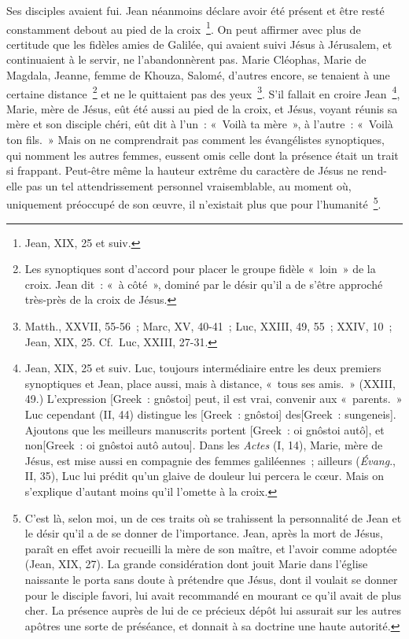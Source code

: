 \documentclass[french,twoside]{book} %
\begin{document}
Ses disciples avaient fui. Jean néanmoins déclare avoir été présent et être resté constamment debout au pied de la croix \footnote{Jean, XIX, 25 et suiv.}. On peut affirmer avec plus de certitude que les fidèles amies de Galilée, qui avaient suivi Jésus à Jérusalem, et continuaient à le servir, ne l’abandonnèrent pas. Marie Cléophas, Marie de Magdala, Jeanne, femme de Khouza, Salomé, d’autres encore, se tenaient à une certaine distance \footnote{Les synoptiques sont d’accord pour placer le groupe fidèle « loin » de la croix. Jean dit : « à côté », dominé par le désir qu’il a de s’être approché très-près de la croix de Jésus.} et ne le quittaient pas des yeux \footnote{Matth., XXVII, 55-56 ; Marc, XV, 40-41 ; Luc, XXIII, 49, 55 ; XXIV, 10 ; Jean, XIX, 25. Cf. Luc, XXIII, 27-31.}. S’il fallait en croire Jean \footnote{ Jean, XIX, 25 et suiv. Luc, toujours intermédiaire entre les deux premiers synoptiques et Jean, place aussi, mais à distance, « tous ses amis. » (XXIII, 49.) L’expression [Greek : gnôstoi] peut, il est vrai, convenir aux « parents. » Luc cependant (II, 44) distingue les [Greek : gnôstoi] des[Greek : sungeneis]. Ajoutons que les meilleurs manuscrits portent [Greek : oi gnôstoi autô], et non[Greek : oi gnôstoi autô autou]. Dans les {\itshape Actes} (I, 14), Marie, mère de Jésus, est mise aussi en compagnie des femmes galiléennes ; ailleurs ({\itshape Évang}., II, 35), Luc lui prédit qu’un glaive de douleur lui percera le cœur. Mais on s’explique d’autant moins qu’il l’omette à la croix.}, Marie, mère de Jésus, eût été aussi au pied de la croix, et Jésus, voyant réunis sa mère et son disciple chéri, eût dit à l’un : « Voilà ta mère », à l’autre : « Voilà ton fils. » Mais on ne comprendrait pas comment les évangélistes synoptiques, qui nomment les autres femmes, eussent omis celle dont la présence était un trait si frappant. Peut-être même la hauteur extrême du caractère de Jésus ne rend-elle pas un tel attendrissement personnel vraisemblable, au moment où, uniquement préoccupé de son œuvre, il n’existait plus que pour l’humanité \footnote{C’est là, selon moi, un de ces traits où se trahissent la personnalité de Jean et le désir qu’il a de se donner de l’importance. Jean, après la mort de Jésus, paraît en effet avoir recueilli la mère de son maître, et l’avoir comme adoptée (Jean, XIX, 27). La grande considération dont jouit Marie dans l’église naissante le porta sans doute à prétendre que Jésus, dont il voulait se donner pour le disciple favori, lui avait recommandé en mourant ce qu’il avait de plus cher. La présence auprès de lui de ce précieux dépôt lui assurait sur les autres apôtres une sorte de préséance, et donnait à sa doctrine une haute autorité.}.\par
\end{document}
